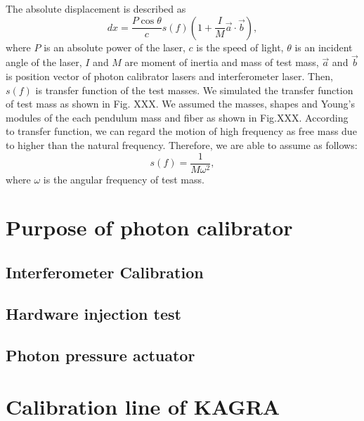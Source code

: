 
The absolute displacement is described as
\begin{equation}
dx=\frac{P \cos{\theta}}{c} s(f) \left( 1+\frac{I}{M}\vec{a}\cdot \vec{b}\right), \label{eq:dx}
\end{equation}
where $P$ is an absolute power of the laser, $c$ is the speed of light, $\theta$  is an incident angle of the laser, $I$ and $M$ are moment of inertia and mass of test mass, $\vec{a}$ and $\vec{b}$ is position vector of photon calibrator lasers and interferometer laser. Then, $s(f)$ is transfer function of the test masses. We simulated the transfer function of test mass as shown in Fig. XXX. We assumed the masses, shapes and Young's modules of the each pendulum mass and fiber as shown in Fig.XXX. According to transfer function, we can regard the motion of high frequency as free mass due to higher than the natural frequency. Therefore, we are able to assume as follows:
\begin{equation}
s(f)=\frac{1}{M \omega^2},
\end{equation}
where $\omega$ is the angular frequency of test mass.
 

\section{Purpose of photon calibrator}
\subsection{Interferometer Calibration}
\subsection{Hardware injection test}
\subsection{Photon pressure actuator}


\section{Calibration line of KAGRA}



